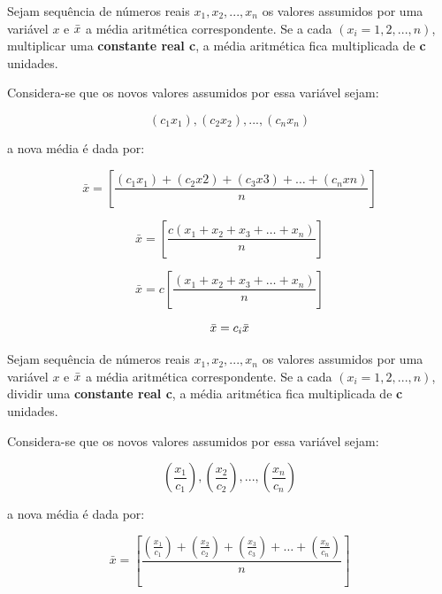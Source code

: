 \begin{enumerate}
\vskip0.3cm
\textbf{} 
\vskip0.3cm

Sejam sequência de números reais $x_{1}, x_{2},...,x_{n}$ os valores assumidos por uma variável $x$ e $\Bar{x}$ a média aritmética correspondente. Se a cada $(x_{i}=1,2,...,n)$, multiplicar uma \textbf{constante real c}, a média aritmética fica multiplicada de \textbf{c} unidades.\vskip0.3cm


Considera-se que os novos valores assumidos por essa variável sejam: 

$$(c_{1}x_{1}),(c_{2}x_{2}),...,(c_{n}x_{n})$$

a nova média é dada por:

\begin{equation*}\label{media3}
     \bar{x} =  \left[ \frac{(c_{1}x_{1})+(c_{2}x{2})+(c_{3}x{3})+\ldots+(c_{n}x{n})}{n} \right]
\end{equation*}

\begin{equation*}\label{media3}
     \bar{x} = \left[ \frac{c(x_{1}+x_{2}+x_{3}+\ldots+x_{n})}{n} \right]
\end{equation*}

\begin{equation*}\label{media3}
     \bar{x}=c \left[\frac{(x_{1}+x_{2}+x_{3}+\ldots+x_{n})}{n} \right]
\end{equation*}


\begin{equation*}\label{media3}
     \bar{x}=c_{i}\Bar{x} 
\end{equation*}



\newpage
\textbf{} 
\vskip0.3cm

Sejam sequência de números reais $x_{1}, x_{2},...,x_{n}$ os valores assumidos por uma variável $x$ e $\Bar{x}$ a média aritmética correspondente. Se a cada $(x_{i}=1,2,...,n)$, dividir uma \textbf{constante real c}, a média aritmética fica multiplicada de \textbf{c} unidades.\vskip0.3cm


Considera-se que os novos valores assumidos por essa variável sejam: 

$$\left( \frac{x_{1}}{c_{1}} \right), \left( \frac{x_{2}}{c_{2}} \right),..., \left( \frac{x_{n}}{c_{n}}\right)$$


a nova média é dada por:

\begin{equation*}\label{media3}
     \bar{x} = \left[ \frac{\left( \frac{x_{1}}{c_{1}} \right)+ \left( \frac{x_{2}}{c_{2}} \right)+ \left( \frac{x_{3}}{c_{3}}\right)+\ldots+\left( \frac{x_{n}}{c_{n}} \right)}{n} \right]
\end{equation*}


\end{enumerate}

